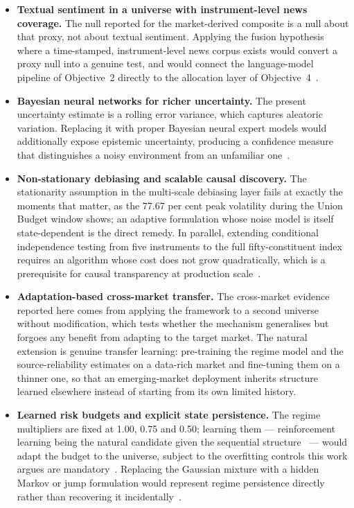 \begin{itemize}
\item \textbf{Textual sentiment in a universe with instrument-level news coverage.} The null
reported for the market-derived composite is a null about that proxy, not about textual
sentiment. Applying the fusion hypothesis where a time-stamped, instrument-level news corpus
exists would convert a proxy null into a genuine test, and would connect the language-model
pipeline of Objective~2 directly to the allocation layer of Objective~4~\cite{officioso2026,
liu2024llmreview}.

\item \textbf{Bayesian neural networks for richer uncertainty.} The present uncertainty
estimate is a rolling error variance, which captures aleatoric variation. Replacing it with
proper Bayesian neural expert models would additionally expose epistemic uncertainty, producing
a confidence measure that distinguishes a noisy environment from an unfamiliar
one~\cite{gal2016dropout,kendall2017,khuwaja2023}.

\item \textbf{Non-stationary debiasing and scalable causal discovery.} The stationarity
assumption in the multi-scale debiasing layer fails at exactly the moments that matter, as the
77.67 per cent peak volatility during the Union Budget window shows; an adaptive formulation
whose noise model is itself state-dependent is the direct remedy. In parallel, extending
conditional independence testing from five instruments to the full fifty-constituent index
requires an algorithm whose cost does not grow quadratically, which is a prerequisite for
causal transparency at production scale~\cite{liu2026dynamic,spirtes2000}.

\item \textbf{Adaptation-based cross-market transfer.} The cross-market evidence reported here
comes from applying the framework to a second universe without modification, which tests
whether the mechanism generalises but forgoes any benefit from adapting to the target market.
The natural extension is genuine transfer learning: pre-training the regime model and the
source-reliability estimates on a data-rich market and fine-tuning them on a thinner one, so
that an emerging-market deployment inherits structure learned elsewhere instead of starting
from its own limited history.

\item \textbf{Learned risk budgets and explicit state persistence.} The regime multipliers are
fixed at 1.00, 0.75 and 0.50; learning them --- reinforcement learning being the natural
candidate given the sequential structure~\cite{kabbani2022drl} --- would adapt the budget to
the universe, subject to the overfitting controls this work argues are
mandatory~\cite{harvey2015}. Replacing the Gaussian mixture with a hidden Markov or jump
formulation would represent regime persistence directly rather than recovering it
incidentally~\cite{luo2026regime,hamilton1989}.


\end{itemize}
